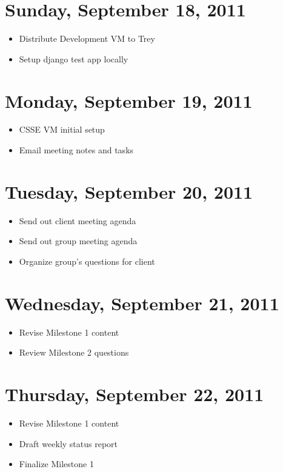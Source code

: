 \documentclass{article}
\begin{document}
\section{Sunday, September 18, 2011}
\begin{itemize}
\item Distribute Development VM to Trey
\item Setup django test app locally
\end{itemize}

\section{Monday, September 19, 2011}
\begin{itemize}
\item CSSE VM initial setup
\item Email meeting notes and tasks
\end{itemize}

\section{Tuesday, September 20, 2011}
\begin{itemize}
\item Send out client meeting agenda
\item Send out group meeting agenda
\item Organize group's questions for client
\end{itemize}

\section{Wednesday, September 21, 2011}
\begin{itemize}
\item Revise Milestone 1 content
\item Review Milestone 2 questions
\end{itemize}

\section{Thursday, September 22, 2011}
\begin{itemize}
\item Revise Milestone 1 content
\item Draft weekly status report
\item Finalize Milestone 1
\end{itemize}
\end{document}
